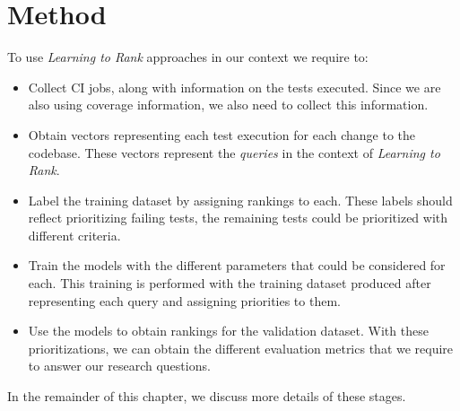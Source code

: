 \chapter{Method}\label{s:method}
To use \emph{Learning to Rank} approaches in our context we require to:
\begin{itemize}
    \item Collect CI jobs, along with information on the tests executed. Since we are also using coverage information, we also need to collect this information.
    \item Obtain vectors representing each test execution for each change to the codebase. These vectors represent the \emph{queries} in the context of \emph{Learning to Rank}.
    \item Label the training dataset by assigning rankings to each. These labels should reflect prioritizing failing tests, the remaining tests could be prioritized with different criteria.
    \item Train the models with the different parameters that could be considered for each. This training is performed with the training dataset produced after representing each query and assigning priorities to them.
    \item Use the models to obtain rankings for the validation dataset. With these prioritizations, we can obtain the different evaluation metrics that we require to answer our research questions.
\end{itemize}

In the remainder of this chapter, we discuss more details of these stages.




